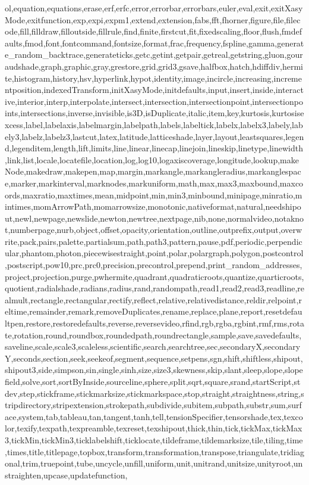 {ol,equation,equations,erase,erf,erfc,error,errorbar,errorbars,euler,eval,exit,exitXasyMode,exitfunction,exp,expi,expm1,extend,extension,fabs,fft,fhorner,figure,file,filecode,fill,filldraw,filloutside,fillrule,find,finite,firstcut,fit,fixedscaling,floor,flush,fmdefaults,fmod,font,fontcommand,fontsize,format,frac,frequency,fspline,gamma,generate_random_backtrace,generateticks,getc,getint,getpair,getreal,getstring,gluon,gouraudshade,graph,graphic,gray,grestore,grid,grid3,gsave,halfbox,hatch,hdiffdiv,hermite,histogram,history,hsv,hyperlink,hypot,identity,image,incircle,increasing,incrementposition,indexedTransform,initXasyMode,initdefaults,input,insert,inside,interactive,interior,interp,interpolate,intersect,intersection,intersectionpoint,intersectionpoints,intersections,inverse,invisible,is3D,isDuplicate,italic,item,key,kurtosis,kurtosisexcess,label,labelaxis,labelmargin,labelpath,labels,labeltick,labelx,labelx3,labely,labely3,labelz,labelz3,lastcut,latex,latitude,latticeshade,layer,layout,leastsquares,legend,legenditem,length,lift,limits,line,linear,linecap,linejoin,lineskip,linetype,linewidth,link,list,locale,locatefile,location,log,log10,logaxiscoverage,longitude,lookup,makeNode,makedraw,makepen,map,margin,markangle,markangleradius,markanglespace,marker,markinterval,marknodes,markuniform,math,max,max3,maxbound,maxcoords,maxratio,maxtimes,mean,midpoint,min,min3,minbound,minipage,minratio,mintimes,momArrowPath,momarrowsize,monotonic,nativeformat,natural,needshipout,newl,newpage,newslide,newton,newtree,nextpage,nib,none,normalvideo,notaknot,numberpage,nurb,object,offset,opacity,orientation,outline,outprefix,output,overwrite,pack,pairs,palette,partialsum,path,path3,pattern,pause,pdf,periodic,perpendicular,phantom,photon,piecewisestraight,point,polar,polargraph,polygon,postcontrol,postscript,pow10,prc,prc0,precision,precontrol,prepend,print_random_addresses,project,projection,purge,pwhermite,quadrant,quadraticroots,quantize,quarticroots,quotient,radialshade,radians,radius,rand,randompath,read1,read2,read3,readline,realmult,rectangle,rectangular,rectify,reflect,relative,relativedistance,reldir,relpoint,reltime,remainder,remark,removeDuplicates,rename,replace,plane,report,resetdefaultpen,restore,restoredefaults,reverse,reversevideo,rfind,rgb,rgba,rgbint,rmf,rms,rotate,rotation,round,roundbox,roundedpath,roundrectangle,sample,save,savedefaults,saveline,scale,scale3,scaleless,scientific,search,searchtree,sec,secondaryX,secondaryY,seconds,section,seek,seekeof,segment,sequence,setpens,sgn,shift,shiftless,shipout,shipout3,side,simpson,sin,single,sinh,size,size3,skewness,skip,slant,sleep,slope,slopefield,solve,sort,sortByInside,sourceline,sphere,split,sqrt,square,srand,startScript,stdev,step,stickframe,stickmarksize,stickmarkspace,stop,straight,straightness,string,stripdirectory,stripextension,strokepath,subdivide,subitem,subpath,substr,sum,surface,system,tab,tableau,tan,tangent,tanh,tell,tensionSpecifier,tensorshade,tex,texcolor,texify,texpath,texpreamble,texreset,texshipout,thick,thin,tick,tickMax,tickMax3,tickMin,tickMin3,ticklabelshift,ticklocate,tildeframe,tildemarksize,tile,tiling,time,times,title,titlepage,topbox,transform,transformation,transpose,triangulate,tridiagonal,trim,truepoint,tube,uncycle,unfill,uniform,unit,unitrand,unitsize,unityroot,unstraighten,upcase,updatefunction,}
